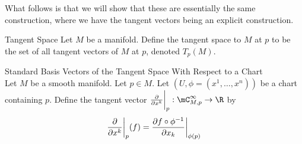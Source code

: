 \documentclass[a4paper]{article}
\begin{document}
What follows is that we will show that these are essentially the same construction, where we have the tangent vectors being an explicit construction. 

\begin{defn}{Tangent Space}{} Let $M$ be a manifold. Define the tangent space to $M$ at $p$ to be the set of all tangent vectors of $M$ at $p$, denoted $T_p(M)$. 
\end{defn}

\begin{defn}{Standard Basis Vectors of the Tangent Space With Respect to a Chart}{}\\
Let $M$ be a smooth manifold. Let $p\in M$. Let $(U,\phi=(x^1,\dots,x^n))$ be a chart containing $p$. Define the tangent vector $\frac{\partial}{\partial x^k}\bigg{|}_p:\mC_{M,p}^\infty\to\R$ by $$\frac{\partial}{\partial x^k}\bigg{|}_p(f)=\frac{\partial f\circ\phi^{-1}}{\partial x_k}\bigg{|}_{\phi(p)}$$
\end{defn}
\end{document}
